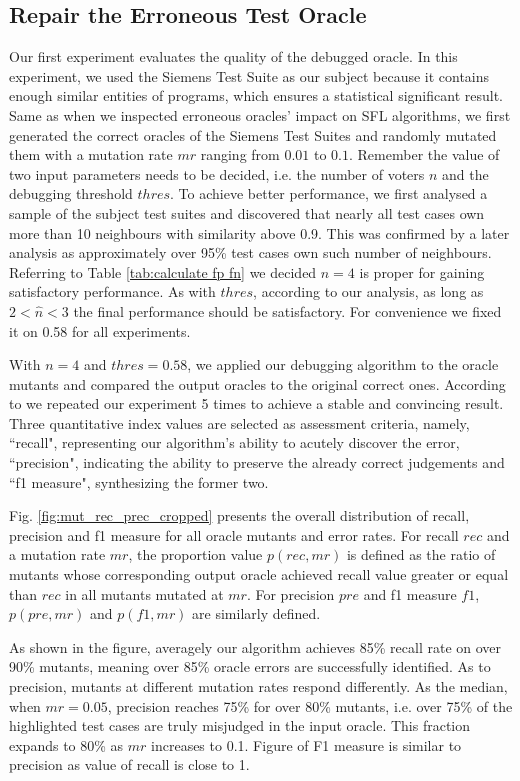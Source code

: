 \subsection{Repair the Erroneous Test Oracle}
\label{subsection: repair test oracle}
Our first experiment evaluates the quality of the debugged oracle. In this experiment, we used the Siemens Test Suite as our subject because it contains enough similar entities of programs, which ensures a statistical significant result. Same as when we inspected erroneous oracles' impact on SFL algorithms, we first generated the correct oracles of the Siemens Test Suites and randomly mutated them with a mutation rate $mr$ ranging from $0.01$ to $0.1$.
Remember the value of two input parameters needs to be decided, i.e. the number of voters $n$ and the debugging threshold $thres$. To achieve better performance, we first analysed a sample of the subject test suites and discovered that nearly all test cases own more than 10 neighbours with similarity above 0.9. This was confirmed by a later analysis as approximately over 95\% test cases own such number of neighbours. Referring to Table \ref{tab:calculate fp fn} we decided $n=4$ is proper for gaining satisfactory performance. As with $thres$, according to our analysis, as long as $2 < \hat{n} < 3$ the final performance should be satisfactory. For convenience we fixed it on 0.58 for all experiments.

With $n = 4$ and $thres = 0.58$, we applied our debugging algorithm to the oracle mutants and compared the output oracles to the original correct ones. According to \cite{Steimann:2013:TVV:2483760.2483767} we repeated our experiment 5 times to achieve a stable and convincing result. Three quantitative index values are selected as assessment criteria, namely, ``recall", representing our algorithm's ability to acutely discover the error, ``precision", indicating the ability to preserve the already correct judgements and ``f1 measure", synthesizing the former two.

Fig. \ref{fig:mut_rec_prec_cropped} presents the overall distribution of recall, precision and f1 measure for all oracle mutants and error rates. For recall $rec$ and a mutation rate $mr$, the proportion value $p(rec, mr)$ is defined as the ratio of mutants whose corresponding output oracle achieved recall value greater or equal than $rec$ in all mutants mutated at $mr$. For precision $pre$ and f1 measure $f1$, $p(pre, mr)$ and $p(f1, mr)$ are similarly defined.

As shown in the figure, averagely our algorithm achieves 85\% recall rate on over 90\% mutants, meaning over 85\% oracle errors are successfully identified. As to precision, mutants at different mutation rates respond differently. As the median, when $mr = 0.05$, precision reaches 75\% for over 80\% mutants, i.e. over 75\% of the highlighted test cases are truly misjudged in the input oracle. This fraction expands to 80\% as $mr$ increases to 0.1. Figure of F1 measure is similar to precision as value of recall is close to 1.

